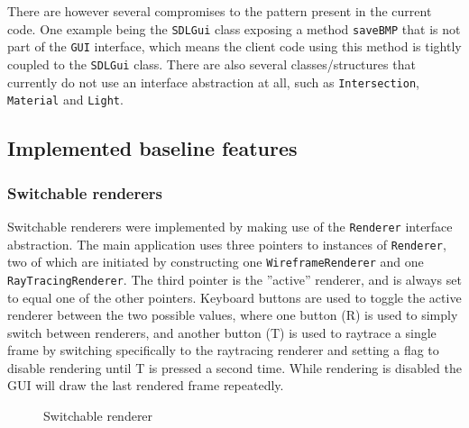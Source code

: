 \documentclass[a4paper,11pt]{article}
\begin{document}
There are however several compromises to the pattern present in the current code. One example
being the \texttt{SDLGui} class exposing a method \texttt{saveBMP} that is not part of the \texttt{GUI} interface, which
means the client code using this method is tightly coupled to the \texttt{SDLGui} class.
There are also several classes/structures that currently do not use an interface
abstraction at all, such as \texttt{Intersection}, \texttt{Material} and \texttt{Light}.

\subsection{Implemented baseline features}
\subsubsection{Switchable renderers}
Switchable renderers were implemented by making use of the \texttt{Renderer} interface abstraction.
The main application uses three pointers to instances of \texttt{Renderer}, two of which are initiated
by constructing one \texttt{WireframeRenderer} and one \texttt{RayTracingRenderer}. The third pointer is
the ''active'' renderer, and is always set to equal one of the other pointers. Keyboard
buttons are used to toggle the active renderer between the two possible values, where one
button (R) is used to simply switch between renderers, and another button (T) is used to
raytrace a single frame by switching specifically to the raytracing renderer and setting
a flag to disable rendering until T is pressed a second time. While rendering is disabled
the GUI will draw the last rendered frame repeatedly.

\begin{figure}[H]
    \centering
    \qquad
    \caption{Switchable renderer}
\end{figure}
\end{document}
